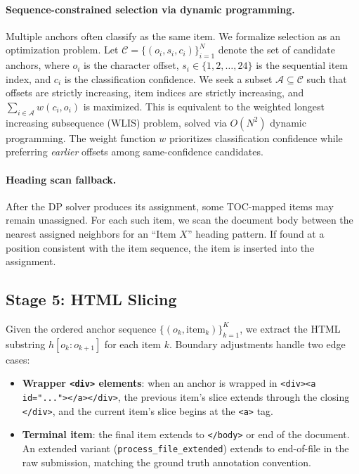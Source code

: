 \documentclass[11pt,a4paper]{article}
\begin{document}
\paragraph{Sequence-constrained selection via dynamic programming.}
Multiple anchors often classify as the same item. We formalize selection as an optimization problem. Let $\mathcal{C} = \{(o_i, s_i, c_i)\}_{i=1}^{N}$ denote the set of candidate anchors, where $o_i$ is the character offset, $s_i \in \{1,2,\ldots,24\}$ is the sequential item index, and $c_i$ is the classification confidence. We seek a subset $\mathcal{A} \subseteq \mathcal{C}$ such that offsets are strictly increasing, item indices are strictly increasing, and $\sum_{i \in \mathcal{A}} w(c_i, o_i)$ is maximized. This is equivalent to the weighted longest increasing subsequence (WLIS) problem, solved via $O(N^2)$ dynamic programming. The weight function $w$ prioritizes classification confidence while preferring \emph{earlier} offsets among same-confidence candidates.

\paragraph{Heading scan fallback.}
After the DP solver produces its assignment, some TOC-mapped items may remain unassigned. For each such item, we scan the document body between the nearest assigned neighbors for an ``Item $X$'' heading pattern. If found at a position consistent with the item sequence, the item is inserted into the assignment.

\subsection{Stage 5: HTML Slicing}

Given the ordered anchor sequence $\{(o_k, \text{item}_k)\}_{k=1}^{K}$, we extract the HTML substring $h[o_k : o_{k+1}]$ for each item $k$. Boundary adjustments handle two edge cases:

\begin{itemize}[nosep]
    \item \textbf{Wrapper \texttt{<div>} elements}: when an anchor is wrapped in \texttt{<div><a id="...">{}</a></div>}, the previous item's slice extends through the closing \texttt{</div>}, and the current item's slice begins at the \texttt{<a>} tag.
    \item \textbf{Terminal item}: the final item extends to \texttt{</body>} or end of the document. An extended variant (\texttt{process\_file\_extended}) extends to end-of-file in the raw submission, matching the ground truth annotation convention.
\end{itemize}
\end{document}
